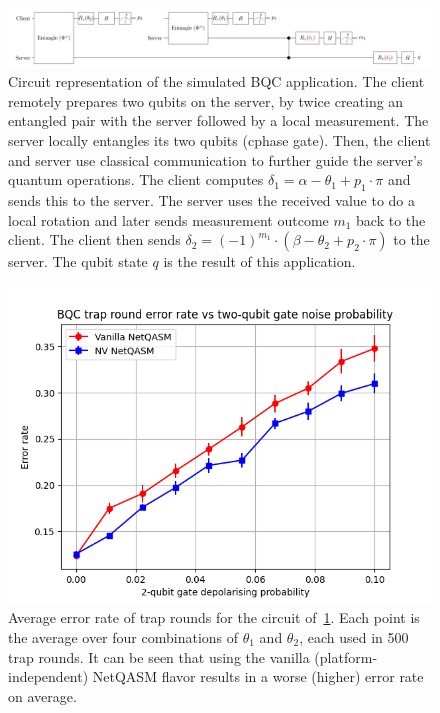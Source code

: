 \begin{figure}[t]
  \centering
  \includegraphics[width=0.6\linewidth]{figures/netqasm/bqc_app.png}
  \caption{Circuit representation of the simulated BQC application. The client
    remotely prepares two qubits on the server, by twice creating an
    entangled pair with the server followed by a local measurement. The
    server locally entangles its two qubits (cphase gate). Then, the client
    and server use classical communication to further guide the server's
    quantum operations. The client computes $\delta_1 = \alpha - \theta_1 +
      p_1 \cdot \pi$ and sends this to the server. The server uses the
    received value to do a local rotation and later sends measurement
    outcome $m_1$ back to the client. The client then sends $\delta_2 =
      (-1)^{m_1} \cdot (\beta - \theta_2 + p_2 \cdot \pi)$ to the server.
    The qubit state $q$ is the result of this application.
  }
  \label{netqasm:fig:bqc_app}
\end{figure}


\begin{figure}[t]
  \centering
  \includegraphics[scale=0.8]{figures/netqasm/plots/bqc_sweep_gate_noise_trap.png}
  \caption{
    Average error rate of trap rounds for the circuit of~\cref{netqasm:fig:bqc_app}.
    Each point is the average over four combinations of $\theta_1$ and $\theta_2$,
    each used in 500 trap rounds. It can be seen that using the vanilla (platform-independent)
    \ac{NetQASM} flavor results in a worse (higher) error rate on average.}
  \label{netqasm:fig:plot_bqc}
\end{figure}

